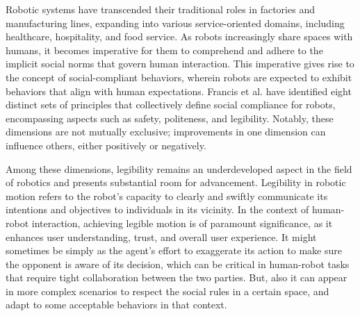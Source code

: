


Robotic systems have transcended their traditional roles in factories and manufacturing lines, expanding into various service-oriented domains, including healthcare, hospitality, and food service. As robots increasingly share spaces with humans, it becomes imperative for them to comprehend and adhere to the implicit social norms that govern human interaction. This imperative gives rise to the concept of social-compliant behaviors, wherein robots are expected to exhibit behaviors that align with human expectations.
%
Francis et al. \cite{francis2023principles} have identified eight distinct sets of principles that collectively define social compliance for robots, encompassing aspects such as safety, politeness, and legibility. Notably, these dimensions are not mutually exclusive; improvements in one dimension can influence others, either positively or negatively.

Among these dimensions, legibility remains an underdeveloped aspect in the field of robotics and presents substantial room for advancement.
Legibility in robotic motion refers to the robot's capacity to clearly and swiftly communicate its intentions and objectives to individuals in its vicinity.
In the context of human-robot interaction, achieving legible motion is of paramount significance, as it enhances user understanding, trust, and overall user experience.
%
It might sometimes be simply as the agent's effort to exaggerate its action to make sure the opponent is aware of its decision, which can be critical in human-robot tasks that require tight collaboration between the two parties.
But, also it can appear in more complex scenarios to respect the social rules in a certain space, and adapt to some acceptable behaviors in that context.

